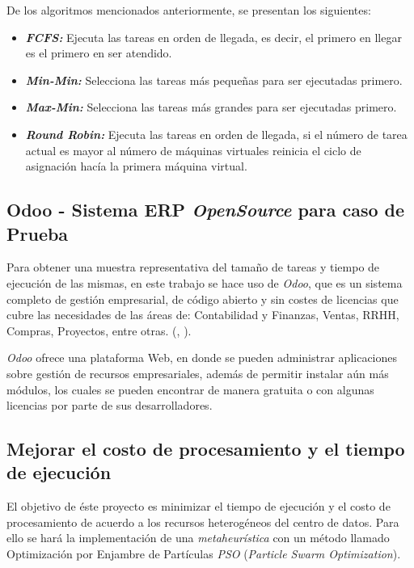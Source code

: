 \documentclass[jou,apacite]{apa6}
\begin{document}
De los algoritmos mencionados anteriormente, se presentan los siguientes:


\begin{itemize}
	\item \textit{\textbf{FCFS:}} Ejecuta las tareas en orden de llegada, es decir, el primero en llegar es el primero en ser atendido.
	\item \textit{\textbf{Min-Min:}} Selecciona las tareas m\'as pequeñas para ser ejecutadas primero.
	\item  \textit{\textbf{Max-Min:}} Selecciona las tareas m\'as grandes para ser ejecutadas primero.
	\item \textit{\textbf{Round Robin:}} Ejecuta las tareas en orden de llegada, si el número de tarea actual es mayor al número de máquinas virtuales reinicia el ciclo de asignación hacía la primera máquina virtual.
\end{itemize}

\subsection{Odoo - Sistema ERP \textit{OpenSource} para caso de Prueba}

Para obtener una muestra representativa del tamaño de tareas y tiempo de ejecución de las mismas, en este trabajo se hace uso de \textit{Odoo}, que es un sistema completo de gestión empresarial, de código abierto y sin costes de licencias que cubre las necesidades de las áreas de: Contabilidad y Finanzas, Ventas, RRHH, Compras, Proyectos, entre otras. (\citeauthor{odooWiki}, \citeyear{odooWiki}).

\textit{Odoo} ofrece una plataforma Web, en donde se pueden administrar aplicaciones sobre gestión de recursos empresariales, además de permitir instalar aún más módulos, los cuales se pueden encontrar de manera gratuita o con algunas licencias por parte de sus desarrolladores.

\subsection{Mejorar el costo de procesamiento y el tiempo de ejecución}

El objetivo de éste proyecto es minimizar el tiempo de ejecución y el costo de procesamiento de acuerdo a los recursos heterogéneos del centro de datos. Para ello se hará la  implementación de una \textit{metaheurística} con un método llamado Optimización por Enjambre de Partículas \textit{PSO} (\textit{Particle Swarm Optimization}).\\
\end{document}
